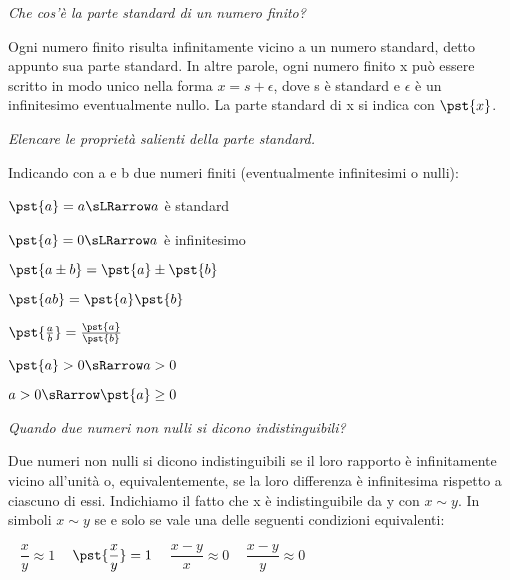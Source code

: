 \begin{esercizio}\label{ese:iper_026} 
\emph{Che cos'è la parte standard di un numero finito?}

Ogni numero finito risulta infinitamente vicino a un numero standard, detto 
appunto sua parte standard. 
In altre parole, ogni numero finito x può 
essere scritto in modo unico nella forma \(x = s + \epsilon\), dove s è 
standard e \(\epsilon\) è un infinitesimo eventualmente nullo. La parte 
standard di x si indica con \(\pst{x}\).
\end{esercizio}


\begin{esercizio}\label{ese:iper_027} 
\emph{Elencare le proprietà salienti della parte standard.}

Indicando con a e b due numeri finiti (eventualmente infinitesimi o nulli):
\vspace{-.5em}
\begin{multicols}{2}
\(\pst{a} = a \sLRarrow a\) è standard

\(\pst{a} = 0 \sLRarrow a\) è infinitesimo

\(\pst{a \pm b} = \pst{a} \pm \pst{b}\)

\(\pst{ab} = \pst{a} \pst{b}\)

\(\pst{\frac{a}{b}} = \frac{\pst{a}}{\pst{b}}\)

\(\pst{a} > 0 \sRarrow a > 0\)

\(a > 0 \sRarrow \pst{a} \geq 0\)
\end{multicols}

\end{esercizio}

\begin{esercizio}\label{ese:iper_028} 
\emph{Quando due numeri non nulli si dicono indistinguibili?}

Due numeri non nulli si dicono indistinguibili se il loro rapporto è 
infinitamente vicino all'unità o, equivalentemente, se la loro differenza è 
infinitesima rispetto a ciascuno di essi. Indichiamo il fatto che x è 
indistinguibile da y con \(x \sim y\). 
In simboli \(x \sim y\) se e solo se vale una 
delle seguenti condizioni equivalenti:
\begin{center}
\textbullet ~ \(\dfrac{x}{y} \approx 1\) \qquad 
\textbullet ~ \(\pst{\dfrac{x}{y}}=1\) \qquad 
\textbullet ~ \(\dfrac{x - y}{x} \approx 0\) \qquad 
\textbullet ~ \(\dfrac{x - y}{y} \approx 0\)
\end{center}

\end{esercizio}

